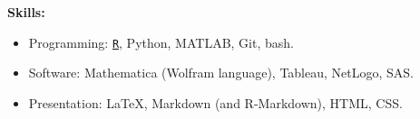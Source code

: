 \textbf{Skills:}

\begin{itemize}[noitemsep]
\item Programming: \ul{\texttt{R}}, Python, MATLAB, Git, bash.
\item Software: Mathematica (Wolfram language), Tableau, NetLogo, SAS.
\item Presentation: \LaTeX{}, Markdown (and R-Markdown), HTML, CSS.
\end{itemize}